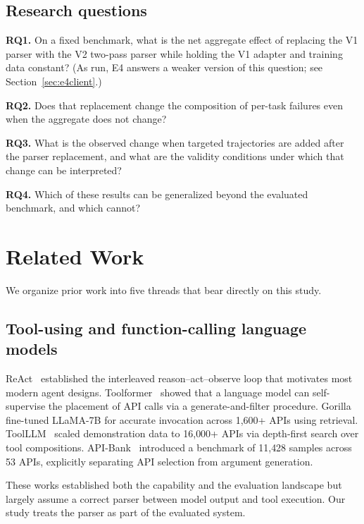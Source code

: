 \documentclass[10pt,twocolumn]{article}
\begin{document}
\subsection{Research questions}

\noindent\textbf{RQ1.} On a fixed benchmark, what is the net aggregate effect of replacing the V1 parser with the V2 two-pass parser while holding the V1 adapter and training data constant? (As run, E4 answers a weaker version of this question; see Section~\ref{sec:e4client}.)

\noindent\textbf{RQ2.} Does that replacement change the composition of per-task failures even when the aggregate does not change?

\noindent\textbf{RQ3.} What is the observed change when targeted trajectories are added after the parser replacement, and what are the validity conditions under which that change can be interpreted?

\noindent\textbf{RQ4.} Which of these results can be generalized beyond the evaluated benchmark, and which cannot?

\section{Related Work}

We organize prior work into five threads that bear directly on this study.

\subsection{Tool-using and function-calling language models}

ReAct~\citep{yao2022react} established the interleaved reason--act--observe loop that motivates most modern agent designs. Toolformer~\citep{schick2023toolformer} showed that a language model can self-supervise the placement of API calls via a generate-and-filter procedure. Gorilla~\citep{patil2023gorilla} fine-tuned LLaMA-7B for accurate invocation across 1,600+ APIs using retrieval. ToolLLM~\citep{qin2023toolllm} scaled demonstration data to 16{,}000+ APIs via depth-first search over tool compositions. API-Bank~\citep{li2023apibank} introduced a benchmark of 11{,}428 samples across 53 APIs, explicitly separating API selection from argument generation.

These works established both the capability and the evaluation landscape but largely assume a correct parser between model output and tool execution. Our study treats the parser as part of the evaluated system.
\end{document}
